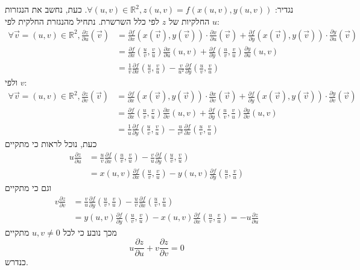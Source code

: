 \documentclass[11pt, oneside]{article}
\newcommand{\qed}{\R{$\blacksquare$}}
\newcommand{\br}{\\\\\\\\}
\newcommand{\mR}{\mathbb{R}}
\renewcommand{\pd}[2]{\frac{\partial #1}{\partial #2}}
\begin{document}
נגדיר: $\forall (u, v) \in \mR^{2}, z(u, v) = f(x(u, v), y(u, v))$. כעת, נחשב את הנגזרות החלקיות של $z$ לפי כלל השרשרת. נתחיל מהנגזרת החלקית לפי $u$:
\begin{align*}
\forall \vec{v} = (u, v) \in \mR^{2}, \pd{z}{u}(\vec{v})
&= \pd{f}{x}(x(\vec{v}), y(\vec{v})) \cdot \pd{x}{u}(\vec{v}) + \pd{f}{y}(x(\vec{v}), y(\vec{v})) \cdot \pd{y}{u}(\vec{v})\\
&= \pd{f}{x}\left(\frac{u}{v}, \frac{v}{u}\right) \pd{x}{u}(u, v) + \pd{f}{y}\left(\frac{u}{v}, \frac{v}{u}\right) \pd{y}{u}(u, v)\\
&= \frac{1}{v}\pd{f}{x}\left(\frac{u}{v}, \frac{v}{u}\right) - \frac{v}{u^{2}}\pd{f}{y}\left(\frac{u}{v}, \frac{v}{u}\right)
\end{align*}
ולפי $v$:
\begin{align*}
\forall \vec{v} = (u, v) \in \mR^{2}, \pd{z}{v}(\vec{v})
&= \pd{f}{x}(x(\vec{v}), y(\vec{v})) \cdot \pd{x}{v}(\vec{v}) + \pd{f}{y}(x(\vec{v}), y(\vec{v})) \cdot \pd{y}{v}(\vec{v})\\
&= \pd{f}{x}\left(\frac{u}{v}, \frac{v}{u}\right) \pd{x}{v}(u, v) + \pd{f}{y}\left(\frac{u}{v}, \frac{v}{u}\right) \pd{y}{v}(u, v)\\
&= \frac{1}{u}\pd{f}{y}\left(\frac{u}{v}, \frac{v}{u}\right) - \frac{u}{v^{2}}\pd{f}{x}\left(\frac{u}{v}, \frac{v}{u}\right)
\end{align*}
כעת, נוכל לראות כי מתקיים
\begin{align*}
u\pd{z}{u}
&= \frac{u}{v}\pd{f}{x}\left(\frac{u}{v}, \frac{v}{u}\right) - \frac{v}{u}\pd{f}{y}\left(\frac{u}{v}, \frac{v}{u}\right)\\
&= x(u, v)\pd{f}{x}\left(\frac{u}{v}, \frac{v}{u}\right) - y(u, v)\pd{f}{y}\left(\frac{u}{v}, \frac{v}{u}\right)
\end{align*}
וגם כי מתקיים
\begin{align*}
v\pd{z}{v}
&= \frac{v}{u}\pd{f}{y}\left(\frac{u}{v}, \frac{v}{u}\right) - \frac{u}{v}\pd{f}{x}\left(\frac{u}{v}, \frac{v}{u}\right)\\
&= y(u, v)\pd{f}{y}\left(\frac{u}{v}, \frac{v}{u}\right) - x(u, v)\pd{f}{x}\left(\frac{u}{v}, \frac{v}{u}\right)
= -u\pd{z}{u}
\end{align*}
מכך נובע כי לכל $u, v \neq 0$ מתקיים
\[
u\pd{z}{u} + v\pd{z}{v} = 0
\]
כנדרש.
\br\qed
\clearpage

\end{document}
